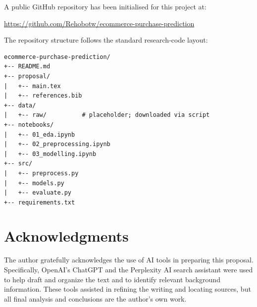 \documentclass[12pt,a4paper]{article}
\begin{document}
A public GitHub repository has been initialised for this project at:\\[4pt]
\centerline{\url{https://github.com/Rehobotw/ecommerce-purchase-prediction}}

The repository structure follows the standard research-code layout:

\begin{verbatim}
ecommerce-purchase-prediction/
+-- README.md
+-- proposal/
|   +-- main.tex
|   +-- references.bib
+-- data/
|   +-- raw/          # placeholder; downloaded via script
+-- notebooks/
|   +-- 01_eda.ipynb
|   +-- 02_preprocessing.ipynb
|   +-- 03_modelling.ipynb
+-- src/
|   +-- preprocess.py
|   +-- models.py
|   +-- evaluate.py
+-- requirements.txt
\end{verbatim}

\section*{Acknowledgments}
The author gratefully acknowledges the use of AI tools in preparing this proposal.  Specifically, OpenAI’s ChatGPT and the Perplexity AI search assistant were used to help draft and organize the text and to identify relevant background information.  These tools assisted in refining the writing and locating sources, but all final analysis and conclusions are the author’s own work.




\end{document}
